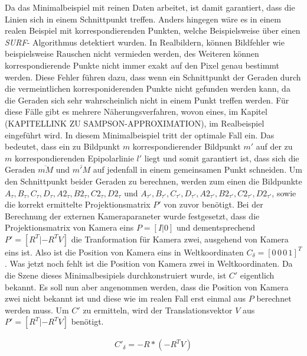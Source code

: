 Da das Minimalbeispiel mit reinen Daten arbeitet, ist damit garantiert, dass die Linien sich in einem Schnittpunkt treffen. Anders hingegen wäre es in einem realen Beispiel mit korrespondierenden Punkten, welche Beispielsweise über einen \textit{SURF}- Algorithmus detektiert wurden\cite{Mandun}. In Realbildern, können Bildfehler wie beispielsweise Rauschen nicht vermieden werden, des Weiteren können korrespondierende Punkte nicht immer exakt auf den Pixel genau bestimmt werden. Diese Fehler führen dazu, dass wenn ein Schnittpunkt der Geraden durch die vermeintlichen korresponiderenden Punkte nicht gefunden werden kann, da die Geraden sich sehr wahrscheinlich nicht in einem Punkt treffen werden\cite{Mandun,HZ}. Für diese Fälle gibt es mehrere Näherungsverfahren, wovon eines, im Kapitel (KAPITELLINK ZU SAMPSON-APPROXIMATION), im Realbeispiel eingeführt wird\cite{HZ}. In diesem Minimalbeispiel tritt der optimale Fall ein. Das bedeutet, dass ein zu Bildpunkt $m$ korrespondierender Bildpunkt $m'$ auf der zu $m$ korrespondierenden Epipolarlinie $l'$ liegt und somit garantiert ist, dass sich die Geraden $\overline{mM}$ und $\overline{m'M}$ auf jedenfall in einem gemeinsamen Punkt schneiden. Um den Schnittpunkt beider Geraden zu berechnen, werden zum einen die Bildpunkte  $A_\tau,B_\tau,C_\tau,D_\tau,A2_\tau,B2_\tau,C2_\tau,D2_\tau$ und $A_{\tau'},B_{\tau'},C_{\tau'},D_{\tau'},A2_{\tau'},B2_{\tau'},C2_{\tau'},D2_{\tau'}$, sowie die korrekt ermittelte Projektionsmatrix $P'$ von zuvor benötigt. Bei der Berechnung der externen Kameraparaneter wurde festgesetzt, dass die Projektionsmatrix von Kamera eins $P = [I|0]$ und dementsprechend $P' = [R^T|-R^TV]$ die Tranformation für Kamera zwei, ausgehend von Kamera eins ist. Also ist die Position von Kamera eins in Weltkoordinaten $C_\delta = [0 \, 0 \, 0 \, 1]^T$. Was jetzt noch fehlt ist die Position von Kamera zwei in Weltkoordinaten. Da die Szene dieses Minimalbesipiels durchkonstruiert wurde, ist $C'$ eigentlich bekannt. Es soll nun aber angenommen werden, dass die Position von Kamera zwei nicht bekannt ist und diese wie im realen Fall erst einmal aus $P$ berechnet werden muss. Um $C'$ zu ermitteln, wird der Translationsvektor $V$ aus  $P' = [R^T|-R^TV]$ benötigt. 

\begin{gather}
	C'_\delta = - R* (-R^TV)
\end{gather}

